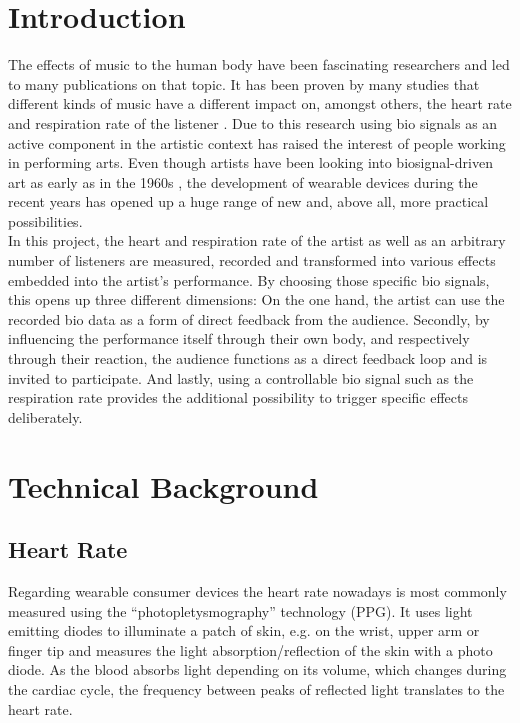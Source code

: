 \documentclass{sigchi-ext}
\begin{document}
\section{Introduction}
The effects of music to the human body have been fascinating researchers and led to
many publications on that topic. It has been proven by many studies that
different kinds of music have a different impact on, amongst others, the heart rate and
respiration rate of the listener \cite{dousty,shin,tsuroka,inesta2008heart}. Due to this research
using bio signals as an active component in the artistic context has raised the 
interest of people working in performing arts. Even though artists have been looking into 
biosignal-driven art as early as in the 1960s \cite{history_biosignal_art}, the development
of wearable devices during the recent years has opened up a huge range of new and, above
all, more practical possibilities. \\
In this project, the heart and respiration rate of the artist as well as an arbitrary number
of listeners are measured, recorded and transformed into various effects embedded into the
artist's performance. By choosing those specific bio signals, this opens up three different
dimensions: On the one hand, the artist can use the recorded bio data as a form of direct
feedback from the audience. Secondly, by influencing the performance itself through their
own body, and respectively through their reaction, the audience functions as a direct feedback
loop and is invited to participate. And lastly, using a controllable
bio signal such as the respiration rate provides the additional possibility to trigger specific
effects deliberately.

\section{Technical Background}

\subsection{Heart Rate}

Regarding wearable consumer devices the heart rate nowadays is most commonly measured using the ``photopletysmography'' technology (PPG).
It uses light emitting diodes to illuminate a patch of skin, e.g. on the wrist, upper arm
or finger tip and measures the light absorption/reflection of the skin with a photo diode. As the blood absorbs light depending on its volume, which changes during the cardiac cycle, the frequency between peaks of reflected light translates to the heart rate.
\end{document}
